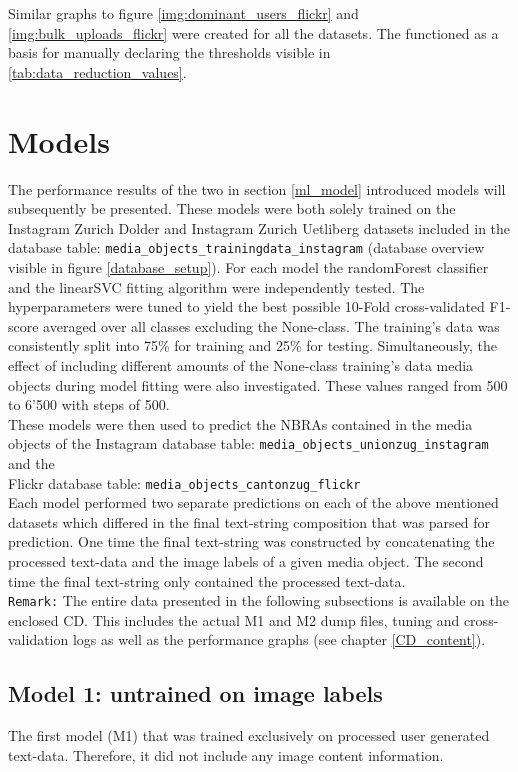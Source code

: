 Similar graphs to figure \ref{img:dominant_users_flickr} and \ref{img:bulk_uploads_flickr} were created for all the datasets. The functioned as a basis for manually declaring the thresholds visible in \ref{tab:data_reduction_values}. 

\section{Models} \label{results_models}
The performance results of the two in section \ref{ml_model} introduced models will subsequently be presented. These models were both solely trained on the Instagram Zurich Dolder and Instagram Zurich Uetliberg datasets included in the database table: \texttt{media\_objects\_trainingdata\_instagram} (database overview visible in figure \ref{database_setup}). For each model the randomForest classifier and the linearSVC fitting algorithm were independently tested. The hyperparameters were tuned to yield the best possible 10-Fold cross-validated F1-score averaged over all classes excluding the None-class. The training's data was consistently split into 75\% for training and 25\% for testing. Simultaneously, the effect of including different amounts of the None-class training's data media objects during model fitting were also investigated. These values ranged from 500 to 6'500 with steps of 500.\\
These models were then used to predict the NBRAs contained in the media objects of the Instagram database table: \texttt{media\_objects\_unionzug\_instagram} and the \\Flickr database table: \texttt{media\_objects\_cantonzug\_flickr}\\
Each model performed two separate predictions on each of the above mentioned datasets which differed in the final text-string composition that was parsed for prediction. One time the final text-string was constructed by concatenating the processed text-data and the image labels of a given media object. The second time the final text-string only contained the processed text-data.\\
\newline
\texttt{Remark:} The entire data presented in the following subsections is available on the enclosed CD. This includes the actual M1 and M2 dump files, tuning and cross-validation logs as well as the performance graphs (see chapter \ref{CD_content}).

\subsection{Model 1: untrained on image labels}
The first model (M1) that was trained exclusively on processed user generated text-data. Therefore, it did not include any image content information.

